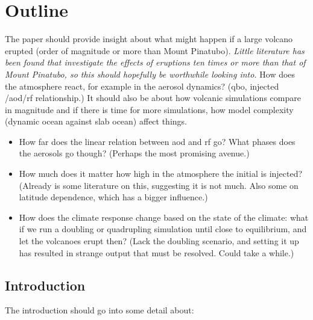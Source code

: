 \documentclass[twocol]{ametsocV5}
\newcommand{\iso}[1][i]{{#1}njected \ce{SO2}}
\begin{document}
\section{Outline}

The paper should provide insight about what might happen if a large volcano erupted
(order of magnitude or more than Mount Pinatubo). \emph{Little literature has been found
  that investigate the effects of eruptions ten times or more than that of Mount Pinatubo,
  so this should hopefully be worthwhile looking into.} How does the atmosphere react, for
example in the aerosol dynamics? (\acrshort{qbo}, \iso{}/\acrshort{aod}/\acrshort{rf}
relationship.) It should also be about how volcanic simulations compare in magnitude and
if there is time for more simulations, how model complexity (dynamic ocean against slab
ocean) affect things.
\begin{itemize}
  \item How far does the linear relation between \acrshort{aod} and \acrshort{rf} go? What
        phases does the aerosols go though? (Perhaps the most promising avenue.)
  \item How much does it matter how high in the atmosphere the initial  is injected?
        (Already is some literature on this, suggesting it is not much. Also some on latitude
        dependence, which has a bigger influence.)
  \item How does the climate response change based on the state of the climate: what if we run a
         doubling or quadrupling simulation until close to equilibrium, and let the
        volcanoes erupt then? (Lack the doubling scenario, and setting it up has resulted in
        strange output that must be resolved. Could take a while.)
\end{itemize}

\subsection{Introduction}

The introduction should go into some detail about:
\end{document}
